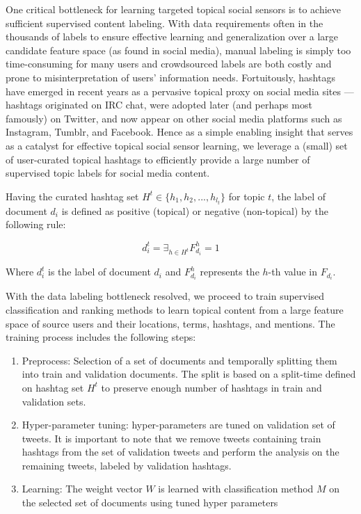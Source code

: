 One critical bottleneck for learning targeted topical social sensors
is to achieve sufficient supervised content labeling.  With data
requirements often in the thousands of labels to ensure effective
learning and generalization over a large candidate feature space (as
found in social media), manual labeling is simply too time-consuming
for many users and crowdsourced labels are both costly and prone to
misinterpretation of users' information needs.  Fortuitously, hashtags
have emerged in recent years as a pervasive topical proxy on social
media sites --- hashtags originated on IRC chat, were adopted later
(and perhaps most famously) on Twitter, and now appear on other social
media platforms such as Instagram, Tumblr, and Facebook.  Hence as a
simple enabling insight that serves as a catalyst for effective
topical social sensor learning, we leverage a (small) set of
user-curated topical hashtags to efficiently provide a large number of
supervised topic labels for social media content.

Having the curated hashtag set $H^{t} \in \{h_{1}, h_{2},...,h_{l_{t}} \}$ for topic $t$, the label of document $d_{i}$ is defined as positive (topical) or negative (non-topical) by the following rule:

\begin{equation}
d_{i}^{t} = \exists _{h \in H^{t}} F_{d_{i}}^{h} = 1
\end{equation}

Where $d_{i}^{t}$ is the label of document $d_{i}$ and $F_{d_{i}}^{h}$ represents the $h$-th value in $F_{d_{i}}$.

With the data labeling bottleneck resolved, we proceed to train
supervised classification and ranking methods to learn topical content
from a large feature space of source users and their locations, terms,
hashtags, and mentions. The training process includes the following steps:%

\begin{enumerate}
\item Preprocess: Selection of a set of documents and temporally splitting them into train and validation documents. The split is based on a split-time defined on hashtag set $H^{t}$ to preserve enough number of hashtags in train and validation sets.
\item Hyper-parameter tuning: hyper-parameters are tuned on validation set of tweets. It is important to note that we remove tweets containing train hashtags from the set of validation tweets and perform the analysis on the remaining tweets, labeled by validation hashtags.
\item Learning: The weight vector $W$ is learned with classification method $M$ on the selected set of documents using tuned hyper parameters
\end{enumerate}
